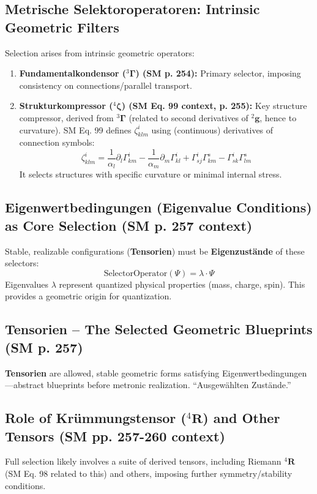 \documentclass[
    12pt,              %
    a4paper,           %
    headings=normal,   %
    twoside=true,      %
    BCOR=8mm,          %
]{scrbook}
\newcommand{\q}[1]{\enquote{#1}}
\newcommand{\kompositionsfeld}{{}^2\mathbf{g}}
\newcommand{\fundamentalkondensor}{{}^3\bm{\Gamma}}
\newcommand{\strukturkompressor}{{}^4\bm{\zeta}}
\begin{document}
\subsection{Metrische Selektoroperatoren: Intrinsic Geometric Filters}
\label{sec:ch11_1_2_selektoroperatoren}
Selection arises from intrinsic geometric operators:
\begin{enumerate}
    \item  \textbf{Fundamentalkondensor (\(\fundamentalkondensor\)) (SM p. 254):} Primary selector, imposing consistency on connections/parallel transport.
    \item  \textbf{Strukturkompressor (\(\strukturkompressor\)) (SM Eq. 99 context, p. 255):} Key structure compressor, derived from \(\fundamentalkondensor\) (related to second derivatives of \(\kompositionsfeld\), hence to curvature). SM Eq. 99 defines \(\zeta^i_{klm}\) using (continuous) derivatives of connection symbols:
        \begin{equation} \label{eq:original_strukturkompressor_def} %
        \zeta^i_{klm} = \frac{1}{\alpha_l} \partial_l \Gamma^i_{km} - \frac{1}{\alpha_m} \partial_m \Gamma^i_{kl} + \Gamma^i_{sj}\Gamma^s_{km} - \Gamma^i_{sk}\Gamma^s_{lm}
        \end{equation}
        It selects structures with specific curvature or minimal internal stress.
\end{enumerate}

\subsection{Eigenwertbedingungen (Eigenvalue Conditions) as Core Selection (SM p. 257 context)}
\label{sec:ch11_1_3_eigenwertbedingungen}
Stable, realizable configurations (\textbf{Tensorien}) must be \textbf{Eigenzustände} of these selectors:
\[ \text{SelectorOperator}(\Psi) = \lambda \cdot \Psi \]
Eigenvalues \(\lambda\) represent quantized physical properties (mass, charge, spin). This provides a geometric origin for quantization.

\subsection{Tensorien – The Selected Geometric Blueprints (SM p. 257)}
\label{sec:ch11_1_4_tensorien}
\textbf{Tensorien} are allowed, stable geometric forms satisfying Eigenwertbedingungen—abstract blueprints before metronic realization. \q{Ausgewählten Zustände.}

\subsection{Role of Krümmungstensor (\({}^4\mathbf{R}\)) and Other Tensors (SM pp. 257-260 context)}
\label{sec:ch11_1_5_kruemmungstensor_etc}
Full selection likely involves a suite of derived tensors, including Riemann \({}^4\mathbf{R}\) (SM Eq. 98 related to this) and others, imposing further symmetry/stability conditions.
\end{document}
